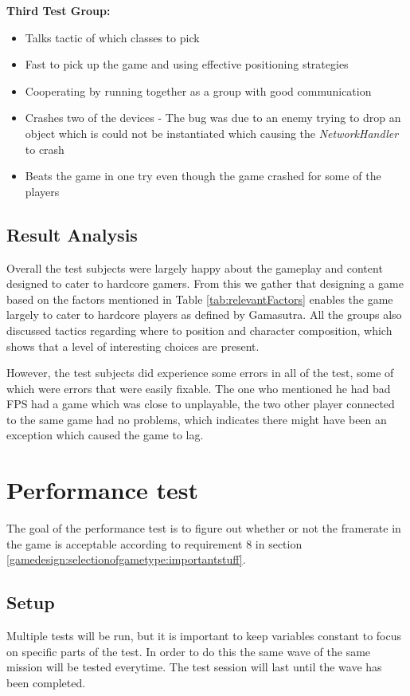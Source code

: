 \textbf{Third Test Group:}\\
\begin{itemize}
\item Talks tactic of which classes to pick
\item Fast to pick up the game and using effective positioning strategies
\item Cooperating by running together as a group with good communication
\item Crashes two of the devices - The bug was due to an enemy trying to drop an object which is could not be instantiated which causing the \textit{NetworkHandler} to crash
\item Beats the game in one try even though the game crashed for some of the players
\end{itemize}

\subsection{Result Analysis}
Overall the test subjects were largely happy about the gameplay and content designed to cater to hardcore gamers.
From this we gather that designing a game based on the factors mentioned in Table \ref{tab:relevantFactors} enables the game largely to cater to hardcore players as defined by Gamasutra\cite{casual_vs_hardcore}.
All the groups also discussed tactics regarding where to position and character composition, which shows that a level of interesting choices are present.

However, the test subjects did experience some errors in all of the test, some of which were errors that were easily fixable. The one who mentioned he had bad FPS had a game which was close to unplayable, the two other player connected to the same game had no problems, which indicates there might have been an exception which caused the game to lag.


\section{Performance test}\label{test:performancetest}
The goal of the performance test is to figure out whether or not the framerate in the game is acceptable according to requirement 8 in section \ref{gamedesign:selectionofgametype:importantstuff}. 

\subsection{Setup}
Multiple tests will be run, but it is important to keep variables constant to focus on specific parts of the test. In order to do this the same wave of the same mission will be tested everytime. The test session will last until the wave has been completed. 

